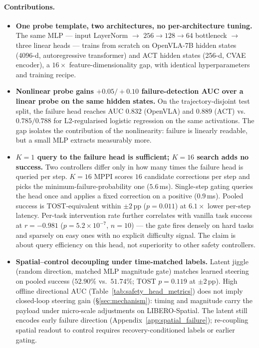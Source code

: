 \paragraph{Contributions.}
\begin{itemize}[leftmargin=1.2em, topsep=2pt, itemsep=2pt]
    \item[\textbf{C1}] \textbf{One probe template, two architectures, no per-architecture tuning.} The same MLP --- input LayerNorm $\to$ $256 \to 128 \to 64$ bottleneck $\to$ three linear heads --- trains from scratch on OpenVLA-7B hidden states (4096-d, autoregressive transformer) and ACT hidden states (256-d, CVAE encoder), a $16\times$ feature-dimensionality gap, with identical hyperparameters and training recipe.
    \item[\textbf{C2}] \textbf{Nonlinear probe gains $+0.05/+0.10$ failure-detection AUC over a linear probe on the same hidden states.} On the trajectory-disjoint test split, the failure head reaches AUC $0.832$ (OpenVLA) and $0.889$ (ACT) vs.\ $0.785/0.788$ for L2-regularised logistic regression on the same activations. The gap isolates the contribution of the nonlinearity: failure is linearly readable, but a small MLP extracts measurably more.
    \item[\textbf{C3}] \textbf{$K{=}1$ query to the failure head is sufficient; $K{=}16$ search adds no success.} Two controllers differ only in how many times the failure head is queried per step. $K{=}16$ MPPI scores $16$ candidate corrections per step and picks the minimum-failure-probability one ($5.6$\,ms). Single-step gating queries the head once and applies a fixed correction on a positive ($0.9$\,ms). Pooled success is TOST-equivalent within ${\pm}2$\,pp ($p{=}0.011$) at $6.1\times$ lower per-step latency. Per-task intervention rate further correlates with vanilla task success at $r{=}{-}0.981$ ($p{=}5.2{\times}10^{-7}$, $n{=}10$) --- the gate fires densely on hard tasks and sparsely on easy ones with no explicit difficulty signal. The claim is about query efficiency on this head, not superiority to other safety controllers.
    \item[\textbf{C4}] \textbf{Spatial--control decoupling under time-matched labels.} Latent jiggle (random direction, matched MLP magnitude gate) matches learned steering on pooled success ($52.90\%$ vs.\ $51.74\%$; TOST $p{=}0.119$ at $\pm 2$\,pp). High offline directional AUC (Table~\ref{tab:safety_head_metrics}) does not imply closed-loop steering gain (\S\ref{sec:mechanism}): timing and magnitude carry the payload under micro-scale adjustments on LIBERO-Spatial. The latent still encodes early failure direction (Appendix~\ref{app:spatial_failure}); re-coupling spatial readout to control requires recovery-conditioned labels or earlier gating.
\end{itemize}
